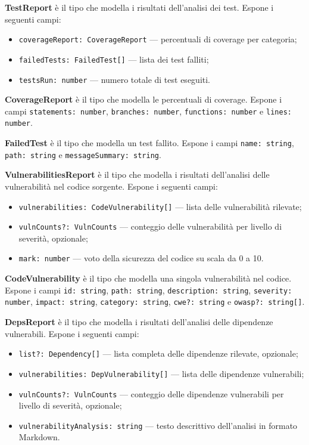 \documentclass[a4paper, 11pt]{article}
\begin{document}
\textbf{TestReport} è il tipo che modella i risultati dell'analisi dei test. Espone i seguenti
campi:
\begin{itemize}
  \item \texttt{coverageReport: CoverageReport} — percentuali di coverage per categoria;
  \item \texttt{failedTests: FailedTest[]} — lista dei test falliti;
  \item \texttt{testsRun: number} — numero totale di test eseguiti.
\end{itemize}

\textbf{CoverageReport} è il tipo che modella le percentuali di coverage. Espone i campi
\texttt{statements: number}, \texttt{branches: number}, \texttt{functions: number} e
\texttt{lines: number}.

\textbf{FailedTest} è il tipo che modella un test fallito. Espone i campi \texttt{name: string},
\texttt{path: string} e \texttt{messageSummary: string}.

\textbf{VulnerabilitiesReport} è il tipo che modella i risultati dell'analisi delle vulnerabilità
nel codice sorgente. Espone i seguenti campi:
\begin{itemize}
  \item \texttt{vulnerabilities: CodeVulnerability[]} — lista delle vulnerabilità rilevate;
  \item \texttt{vulnCounts?: VulnCounts} — conteggio delle vulnerabilità per livello di severità,
        opzionale;
  \item \texttt{mark: number} — voto della sicurezza del codice su scala da 0 a 10.
\end{itemize}

\textbf{CodeVulnerability} è il tipo che modella una singola vulnerabilità nel codice. Espone
i campi \texttt{id: string}, \texttt{path: string}, \texttt{description: string},
\texttt{severity: number}, \texttt{impact: string}, \texttt{category: string},
\texttt{cwe?: string} e \texttt{owasp?: string[]}.

\textbf{DepsReport} è il tipo che modella i risultati dell'analisi delle dipendenze vulnerabili.
Espone i seguenti campi:
\begin{itemize}
  \item \texttt{list?: Dependency[]} — lista completa delle dipendenze rilevate, opzionale;
  \item \texttt{vulnerabilities: DepVulnerability[]} — lista delle dipendenze vulnerabili;
  \item \texttt{vulnCounts?: VulnCounts} — conteggio delle dipendenze vulnerabili per livello
        di severità, opzionale;
  \item \texttt{vulnerabilityAnalysis: string} — testo descrittivo dell'analisi in formato
        Markdown.
\end{itemize}
\end{document}

